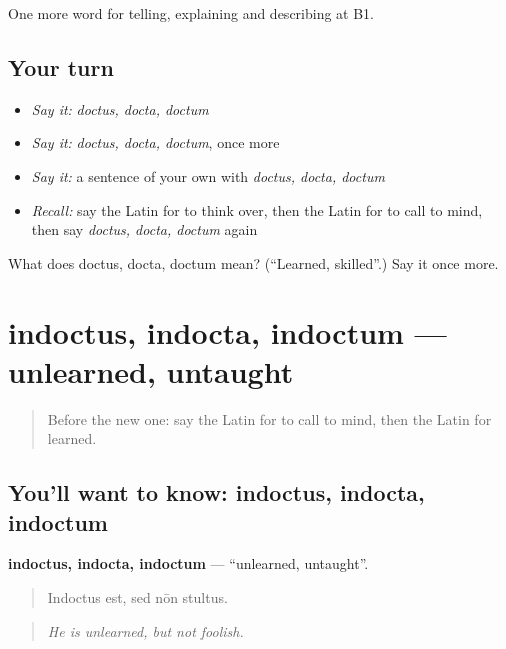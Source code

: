 \begin{grammarlens}[title={What you've built}]
One more word for telling, explaining and describing at B1.
\end{grammarlens}

\subsection*{Your turn}
\begin{itemize}
\raggedright
  \item \emph{Say it:} \emph{doctus, docta, doctum}
  \item \emph{Say it:} \emph{doctus, docta, doctum}, once more
  \item \emph{Say it:} a sentence of your own with \emph{doctus, docta, doctum}
  \item \emph{Recall:} say the Latin for to think over, then the Latin for to call to mind, then say \emph{doctus, docta, doctum} again
\end{itemize}

\begin{tcolorbox}[breakable,colback=teal!4,colframe=teal!35!black,title={Before you move on}]
What does doctus, docta, doctum mean? (\textquotedblleft{}Learned, skilled\textquotedblright{}.) Say it once more.
\end{tcolorbox}
\section[indoctus, indocta, indoctum]{indoctus, indocta, indoctum — unlearned, untaught}

\label{lesson:LA-C403-indoctus}



\begin{quote}
Before the new one: say the Latin for to call to mind, then the Latin for learned.
\end{quote}

\subsection*{You'll want to know: indoctus, indocta, indoctum}
\textbf{indoctus, indocta, indoctum} — \textquotedblleft{}unlearned, untaught\textquotedblright{}.

\begin{quote}
Indoctus est, sed nōn stultus.
\end{quote}

\begin{quote}
\emph{He is unlearned, but not foolish.}
\end{quote}

